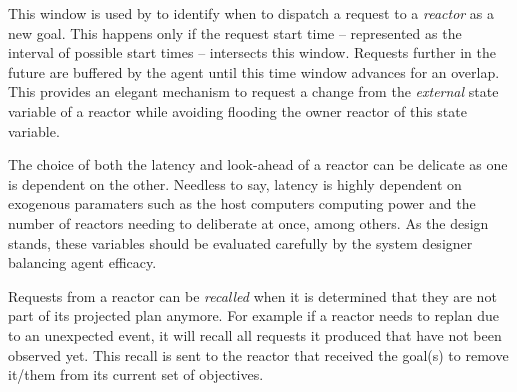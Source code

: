 This window is used by \rx to identify when to dispatch a request to a
{\em reactor} as a new goal. This happens only if the request start
time -- represented as the interval of possible start times --
intersects this window. Requests further in the future are buffered by
the agent until this time window advances for an overlap. This
provides an elegant mechanism to request a change from the {\em
  external} state variable of a reactor while avoiding flooding the
owner reactor of this state variable. 

The choice of both the latency and look-ahead of a reactor can be
delicate as one is dependent on the other. Needless to say, latency is
highly dependent on exogenous paramaters such as the host computers
computing power and the number of reactors needing to deliberate at
once, among others. As the design stands, these variables should be
evaluated carefully by the system designer balancing agent efficacy.


Requests from a reactor can be {\em recalled} when it is determined
that they are not part of its projected plan anymore. For example if a
reactor needs to replan due to an unexpected event, it will recall all
requests it produced that have not been observed 
yet. This recall is sent to the reactor that received the goal(s) to
remove it/them from its current set of objectives.


